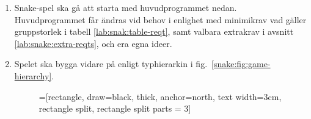 \begin{enumerate}[label={$\square$}, leftmargin=*]

\item Snake-spel ska gå att starta med huvudprogrammet nedan. Huvudprogrammet får ändras vid behov i enlighet med minimikrav vad gäller gruppstorlek i tabell \ref{lab:snak:table-reqt}, samt valbara extrakrav i avsnitt \ref{lab:snake:extra-reqts}, och era egna ideer.
%

\item Spelet ska bygga vidare på  enligt typhierarkin i fig.~\ref{snake:fig:game-hierarchy}.

\begin{figure}[H]
\begin{center}
\newcommand{\TextBox}[1]{\raisebox{0pt}[1em][0.5em]{#1}}
=[rectangle, draw=black,  thick, anchor=north, text width=3cm, rectangle split, rectangle split parts = 3]
\end{center}
\end{figure}
\end{enumerate}
